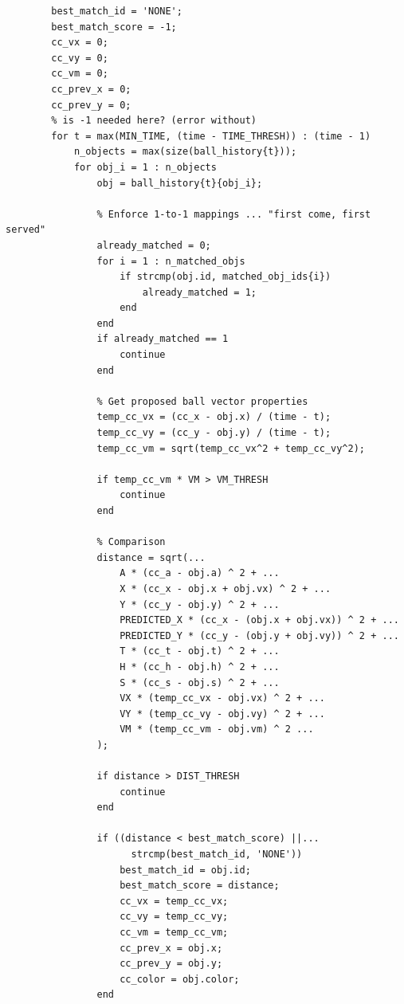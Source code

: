 \documentclass[12pt,a4paper]{article}
\begin{document}
\begin{appendices}
\begin{verbatim}
        best_match_id = 'NONE';
        best_match_score = -1;
        cc_vx = 0;
        cc_vy = 0;
        cc_vm = 0;
        cc_prev_x = 0;
        cc_prev_y = 0;
        % is -1 needed here? (error without)
        for t = max(MIN_TIME, (time - TIME_THRESH)) : (time - 1)  
            n_objects = max(size(ball_history{t}));
            for obj_i = 1 : n_objects
                obj = ball_history{t}{obj_i};
                
                % Enforce 1-to-1 mappings ... "first come, first served"
                already_matched = 0;
                for i = 1 : n_matched_objs
                    if strcmp(obj.id, matched_obj_ids{i})
                        already_matched = 1;
                    end
                end
                if already_matched == 1
                    continue
                end
                
                % Get proposed ball vector properties
                temp_cc_vx = (cc_x - obj.x) / (time - t);
                temp_cc_vy = (cc_y - obj.y) / (time - t);
                temp_cc_vm = sqrt(temp_cc_vx^2 + temp_cc_vy^2);
                
                if temp_cc_vm * VM > VM_THRESH
                    continue
                end
                
                % Comparison
                distance = sqrt(...
                    A * (cc_a - obj.a) ^ 2 + ...
                    X * (cc_x - obj.x + obj.vx) ^ 2 + ...
                    Y * (cc_y - obj.y) ^ 2 + ...
                    PREDICTED_X * (cc_x - (obj.x + obj.vx)) ^ 2 + ...
                    PREDICTED_Y * (cc_y - (obj.y + obj.vy)) ^ 2 + ...
                    T * (cc_t - obj.t) ^ 2 + ...
                    H * (cc_h - obj.h) ^ 2 + ...
                    S * (cc_s - obj.s) ^ 2 + ...
                    VX * (temp_cc_vx - obj.vx) ^ 2 + ...
                    VY * (temp_cc_vy - obj.vy) ^ 2 + ...
                    VM * (temp_cc_vm - obj.vm) ^ 2 ...
                );
            
                if distance > DIST_THRESH
                    continue
                end    
                
                if ((distance < best_match_score) ||...
                      strcmp(best_match_id, 'NONE'))
                    best_match_id = obj.id;
                    best_match_score = distance;
                    cc_vx = temp_cc_vx;
                    cc_vy = temp_cc_vy;
                    cc_vm = temp_cc_vm;
                    cc_prev_x = obj.x;
                    cc_prev_y = obj.y;
                    cc_color = obj.color;
                end
                

\end{verbatim}
\end{appendices}
\end{document}
